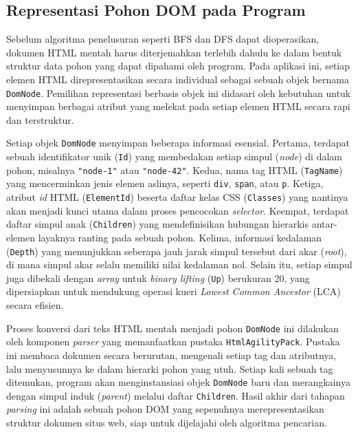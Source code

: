 \documentclass[12pt]{article}
\begin{document}
\subsection{Representasi Pohon DOM pada Program}

Sebelum algoritma penelusuran seperti BFS dan DFS dapat dioperasikan, dokumen HTML mentah harus diterjemahkan terlebih dahulu ke dalam bentuk struktur data pohon yang dapat dipahami oleh program. Pada aplikasi ini, setiap elemen HTML direpresentasikan secara individual sebagai sebuah objek bernama \texttt{DomNode}. Pemilihan representasi berbasis objek ini didasari oleh kebutuhan untuk menyimpan berbagai atribut yang melekat pada setiap elemen HTML secara rapi dan terstruktur.

Setiap objek \texttt{DomNode} menyimpan beberapa informasi esensial. Pertama, terdapat sebuah identifikator unik (\texttt{Id}) yang membedakan setiap simpul (\textit{node}) di dalam pohon, misalnya \texttt{"node-1"} atau \texttt{"node-42"}. Kedua, nama tag HTML (\texttt{TagName}) yang mencerminkan jenis elemen aslinya, seperti \verb|div|, \verb|span|, atau \verb|p|. Ketiga, atribut \textit{id} HTML (\texttt{ElementId}) beserta daftar kelas CSS (\texttt{Classes}) yang nantinya akan menjadi kunci utama dalam proses pencocokan \textit{selector}. Keempat, terdapat daftar simpul anak (\texttt{Children}) yang mendefinisikan hubungan hierarkis antar-elemen layaknya ranting pada sebuah pohon. Kelima, informasi kedalaman (\texttt{Depth}) yang menunjukkan seberapa jauh jarak simpul tersebut dari akar (\textit{root}), di mana simpul akar selalu memiliki nilai kedalaman nol. Selain itu, setiap simpul juga dibekali dengan \textit{array} untuk \textit{binary lifting} (\texttt{Up}) berukuran 20, yang dipersiapkan untuk mendukung operasi kueri \textit{Lowest Common Ancestor} (LCA) secara efisien.

Proses konversi dari teks HTML mentah menjadi pohon \texttt{DomNode} ini dilakukan oleh komponen \textit{parser} yang memanfaatkan pustaka \texttt{HtmlAgilityPack}. Pustaka ini membaca dokumen secara berurutan, mengenali setiap tag dan atributnya, lalu menyusunnya ke dalam hierarki pohon yang utuh. Setiap kali sebuah tag ditemukan, program akan menginstansiasi objek \texttt{DomNode} baru dan merangkainya dengan simpul induk (\textit{parent}) melalui daftar \texttt{Children}. Hasil akhir dari tahapan \textit{parsing} ini adalah sebuah pohon DOM yang sepenuhnya merepresentasikan struktur dokumen situs web, siap untuk dijelajahi oleh algoritma pencarian.
\end{document}
